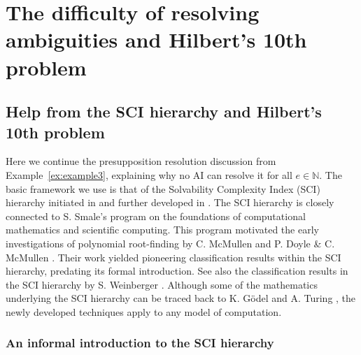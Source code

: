 \documentclass[10pt, a4paper, reqno]{amsart}
\numberwithin{equation}{section}
\theoremstyle{definition}
\theoremstyle{definition}
\begin{document}
\appendix

\section{The difficulty of resolving ambiguities and Hilbert's 10th problem}\label{appendix1}

\subsection{Help from the SCI hierarchy and Hilbert's 10th problem}

Here we continue the presupposition resolution discussion from Example~\ref{ex:example3}, explaining why no AI can resolve it for all $e \in \mathbb{N}$. The basic framework we use is that of the Solvability Complexity Index (SCI) hierarchy initiated in \cite{Hansen_JAMS} and further developed in \cite{CRAS, SCI, colbrook2019foundations, GazdagBastounisHansen2026, ColbrookAntunHansen2022, comp}. The SCI hierarchy is closely connected to S. Smale's \cite{Smale2, Smale_Acta_Numerica} program on the foundations of computational mathematics and scientific computing. This program motivated the early investigations of polynomial root-finding by C. McMullen \cite{McMullen1, McMullen2, Smale_McMullen} and P. Doyle \& C. McMullen \cite{Doyle_McMullen}. Their work yielded pioneering classification results within the SCI hierarchy, predating its formal introduction. See also the classification results in the SCI hierarchy by S. Weinberger \cite{Weinberger}. Although some of the mathematics underlying the SCI hierarchy can be traced back to K. G\"odel \cite{godel1931formal} and A. Turing \cite{Turing_Machine}, the newly developed techniques apply to any model of computation.




\subsubsection{An informal introduction to the SCI hierarchy}
\end{document}
